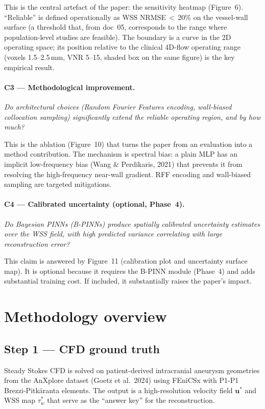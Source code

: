 \documentclass[11pt]{article}
\begin{document}
This is the central artefact of the paper: the sensitivity heatmap (Figure~6).
``Reliable'' is defined operationally as WSS NRMSE\,$<$\,20\% on the vessel-wall
surface (a threshold that, from doc~05, corresponds to the range where population-level
studies are feasible).  The boundary is a curve in the 2D operating space; its
position relative to the clinical 4D-flow operating range (voxels 1.5--2.5\,mm,
VNR 5--15, shaded box on the same figure) is the key empirical result.

\paragraph{C3 — Methodological improvement.}
\textit{Do architectural choices (Random Fourier Features encoding, wall-biased
collocation sampling) significantly extend the reliable operating region, and by how
much?}

This is the ablation (Figure~10) that turns the paper from an evaluation into a method
contribution.  The mechanism is spectral bias: a plain MLP has an implicit low-frequency
bias (Wang \& Perdikaris, 2021) that prevents it from resolving the high-frequency
near-wall gradient.  RFF encoding and wall-biased sampling are targeted mitigations.

\paragraph{C4 — Calibrated uncertainty (optional, Phase~4).}
\textit{Do Bayesian PINNs (B-PINNs) produce spatially calibrated uncertainty estimates
over the WSS field, with high predicted variance correlating with large reconstruction
error?}

This claim is answered by Figure~11 (calibration plot and uncertainty surface map).
It is optional because it requires the B-PINN module (Phase~4) and adds substantial
training cost.  If included, it substantially raises the paper's impact.

\section{Methodology overview}

\subsection*{Step 1 — CFD ground truth}
Steady Stokes CFD is solved on patient-derived intracranial aneurysm geometries from
the AnXplore dataset (Goetz et al.\ 2024) using FEniCSx with P1-P1 Brezzi-Pitkäranta
elements.  The output is a high-resolution velocity field $\mathbf{u}^*$ and WSS map
$\tau_w^*$ that serve as the ``answer key'' for the reconstruction.
\end{document}
